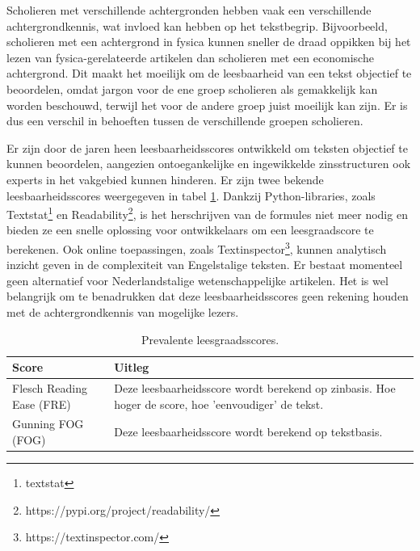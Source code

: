 \medspace

Scholieren met verschillende achtergronden hebben vaak een verschillende achtergrondkennis, wat invloed kan hebben op het tekstbegrip. Bijvoorbeeld, scholieren met een achtergrond in fysica kunnen sneller de draad oppikken bij het lezen van fysica-gerelateerde artikelen dan scholieren met een economische achtergrond. Dit maakt het moeilijk om de leesbaarheid van een tekst objectief te beoordelen, omdat jargon voor de ene groep scholieren als gemakkelijk kan worden beschouwd, terwijl het voor de andere groep juist moeilijk kan zijn. Er is dus een verschil in behoeften tussen de verschillende groepen scholieren.

\medspace


Er zijn door de jaren heen leesbaarheidsscores ontwikkeld om teksten objectief te kunnen beoordelen, aangezien ontoegankelijke en ingewikkelde zinsstructuren ook experts in het vakgebied kunnen hinderen. Er zijn twee bekende leesbaarheidsscores weergegeven in tabel \ref{table:readability-scores}. Dankzij Python-libraries, zoals Textstat\footnote{textstat} en Readability\footnote{https://pypi.org/project/readability/}, is het herschrijven van de formules niet meer nodig en bieden ze een snelle oplossing voor ontwikkelaars om een leesgraadscore te berekenen. Ook online toepassingen, zoals Textinspector\footnote{https://textinspector.com/}, kunnen analytisch inzicht geven in de complexiteit van Engelstalige teksten. Er bestaat momenteel geen alternatief voor Nederlandstalige wetenschappelijke artikelen. Het is wel belangrijk om te benadrukken dat deze leesbaarheidsscores geen rekening houden met de achtergrondkennis van mogelijke lezers.

\begin{center}
	\begin{table}[H]
	\begin{tabular}{ | m{5cm} | m{10cm} | } 
		\hline
		\textbf{Score} & \textbf{Uitleg} \\ 
		\hline
		Flesch Reading Ease (FRE) & Deze leesbaarheidsscore wordt berekend op zinbasis. Hoe hoger de score, hoe 'eenvoudiger' de tekst. \\
		\hline
		Gunning FOG (FOG) & Deze leesbaarheidsscore wordt berekend op tekstbasis. \\
		\hline
	\end{tabular}
	\label{table:readability-scores}
	\caption{Prevalente leesgraadsscores.}
	\end{table}
\end{center}

